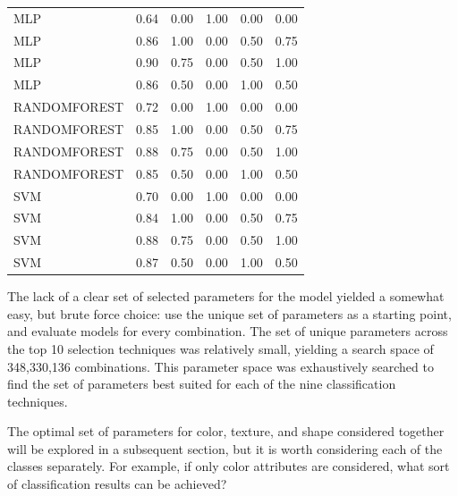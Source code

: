 \documentclass[letterpaper, notitlepage]{report}
\begin{document}
\begin{small}
{\begin{longtable}{lrrrrr}
         MLP & 0.64 &      0.00 & 1.00 &       0.00 &       0.00 \\
         MLP & 0.86 &      1.00 & 0.00 &       0.50 &       0.75 \\
         MLP & 0.90 &      0.75 & 0.00 &       0.50 &       1.00 \\
         MLP & 0.86 &      0.50 & 0.00 &       1.00 &       0.50 \\
RANDOMFOREST & 0.72 &      0.00 & 1.00 &       0.00 &       0.00 \\
RANDOMFOREST & 0.85 &      1.00 & 0.00 &       0.50 &       0.75 \\
RANDOMFOREST & 0.88 &      0.75 & 0.00 &       0.50 &       1.00 \\
RANDOMFOREST & 0.85 &      0.50 & 0.00 &       1.00 &       0.50 \\
         SVM & 0.70 &      0.00 & 1.00 &       0.00 &       0.00 \\
         SVM & 0.84 &      1.00 & 0.00 &       0.50 &       0.75 \\
         SVM & 0.88 &      0.75 & 0.00 &       0.50 &       1.00 \\
         SVM & 0.87 &      0.50 & 0.00 &       1.00 &       0.50 \\
\end{longtable}




}
\end{small}

The lack of a clear set of selected parameters for the model yielded a somewhat easy, but brute force choice: use the unique set of parameters as a starting point, and evaluate models for every combination. The set of unique parameters across the top 10 selection techniques was relatively small, yielding a search space of 348,330,136 combinations. This parameter space was exhaustively searched to find the set of parameters best suited for each of the  nine classification techniques.

The optimal set of parameters for color, texture, and shape considered together will be explored in a subsequent section, but it is worth considering each of the classes separately. For example, if only color attributes are considered, what sort of classification results can be achieved?
\end{document}
